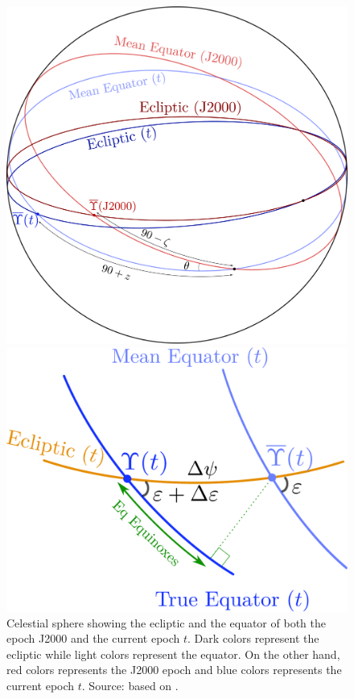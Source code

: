 \documentclass[../main.tex]{subfiles}
\begin{document}
\begin{figure}[htbp]
  \centering
  \begin{minipage}[ht]{0.45\textwidth}
    \centering
    \includegraphics[width=\textwidth]{Images/ecliptic_equator.pdf}
    \caption{Celestial sphere showing the ecliptic and the equator of both the epoch J2000 and the current epoch $t$. Dark colors represent the ecliptic while light colors represent the equator. On the other hand, red colors represents the J2000 epoch and blue colors represents the current epoch $t$. Source: based on \cite{montenbruck}.}
    \label{fig:precession_matrix}
  \end{minipage}
  \hspace{0.0333333\textwidth}
  \begin{minipage}[ht]{0.45\textwidth}
    \centering
    \includegraphics[width=\textwidth]{Images/nutation_matrix.pdf}

\end{minipage}
\end{figure}
\end{document}
